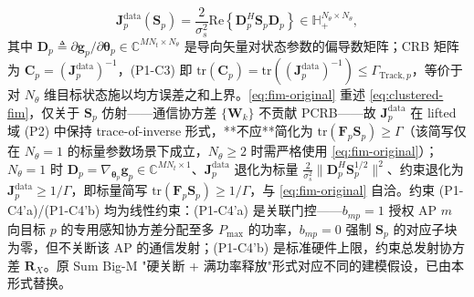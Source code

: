 \documentclass[12pt,a4paper]{article}
\newcommand{\vect}[1]{\mathbf{#1}}
\newcommand{\mat}[1]{\mathbf{#1}}
\newcommand{\tr}{\text{tr}}
\newcommand{\Real}{\text{Re}}
\begin{document}
\begin{equation}\label{eq:fim-original}
\mat{J}_p^{\text{data}}(\mat{S}_p) = \frac{2}{\sigma_s^2} \Real\!\left\{ \mat{D}_p^H \mat{S}_p \mat{D}_p \right\} \in \mathbb{H}_+^{N_\theta \times N_\theta},
\end{equation}
其中 $\mat{D}_p \triangleq \partial \vect{g}_p / \partial \boldsymbol{\theta}_p \in \mathbb{C}^{MN_t \times N_\theta}$ 是导向矢量对状态参数的偏导数矩阵；CRB 矩阵为 $\mat{C}_p = (\mat{J}_p^{\text{data}})^{-1}$，(P1-C3) 即 $\tr(\mat{C}_p) = \tr((\mat{J}_p^{\text{data}})^{-1}) \leq \Gamma_{\text{Track},p}$，等价于对 $N_\theta$ 维目标状态施以均方误差之和上界。\eqref{eq:fim-original} 重述 \eqref{eq:clustered-fim}，仅关于 $\mat{S}_p$ 仿射——通信协方差 $\{\mat{W}_k\}$ 不贡献 PCRB——故 $\mat{J}_p^{\text{data}}$ 在 lifted 域 (P2) 中保持 trace-of-inverse 形式，**不应**简化为 $\tr(\mat{F}_p \mat{S}_p) \geq \Gamma$（该简写仅在 $N_\theta = 1$ 的标量参数场景下成立，$N_\theta \geq 2$ 时需严格使用 \eqref{eq:fim-original}）；$N_\theta = 1$ 时 $\mat{D}_p = \nabla_{\boldsymbol{\theta}_p} \vect{g}_p \in \mathbb{C}^{MN_t \times 1}$、$\mat{J}_p^{\text{data}}$ 退化为标量 $\frac{2}{\sigma_s^2} \|\mat{D}_p^H \mat{S}_p^{1/2}\|^2$、约束退化为 $\mat{J}_p^{\text{data}} \geq 1/\Gamma$，即标量简写 $\tr(\mat{F}_p \mat{S}_p) \geq 1/\Gamma$，与 \eqref{eq:fim-original} 自洽。约束 (P1-C4'a)/(P1-C4'b) 均为线性约束：(P1-C4'a) 是关联门控——$b_{mp}=1$ 授权 AP $m$ 向目标 $p$ 的专用感知协方差分配至多 $P_{\max}$ 的功率，$b_{mp}=0$ 强制 $\mat{S}_p$ 的对应子块为零，但不关断该 AP 的通信发射；(P1-C4'b) 是标准硬件上限，约束总发射协方差 $\mat{R}_X$。原 Sum Big-M "硬关断 + 满功率释放"形式对应不同的建模假设，已由本形式替换。
\end{document}
